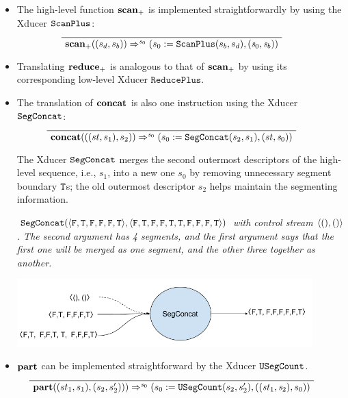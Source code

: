 \begin{itemize}
\item The high-level function $\mathbf{scan}_+$ is implemented straightforwardly by using the  Xducer $\mathtt{ScanPlus}_{}$:
	$$	\PT{
	\Axiom{\Transf{\*{scan}_+}{(s_d,s_b)}{\s_0}{}{\sfun{\sdef{s_0}{\scanf{s_b}{s_d}}} {(\s_0,\s_b)}}}
}$$

\item Translating $\mathbf{reduce}_+$ is analogous to that of $\mathbf{scan}_+$ by using its corresponding low-level Xducer $\mathtt{ReducePlus}$.

\item The translation of $\mathbf{concat}$ is also one instruction using the Xducer $\mathtt{SegConcat}$:
$$	\PT{
	\Axiom{\Transf{\*{concat}}{((st,s_1),s_2)}{\s_0}{}{\sfun{\sdef{s_0}{\segconcat(s_2,s_1)}} {(st,\s_0)}}}
}$$


The Xducer $\mathtt{SegConcat}$ merges the second outermost descriptors of the high-level sequence, i.e., $s_1$, into a new one $s_0$ by removing unnecessary segment boundary $\mathtt{T}$s; the old outermost descriptor $s_2$ helps maintain the segmenting information.

\begin{example} \emph{$\segconcat(\<\F,\T,\F,\F,\F,\T\'>,\< \F,\T, \F,\F,\T,\T, \F,\F, \F,\T \'>)$ with control stream $\<(),()\'>$. The second argument has 4 segments, and the first argument says that the first one will be merged as one segment, and the other three together as another.}\\
	\begin{center}
		\includegraphics[width=0.9\textwidth]{fig/segconcatxducer.png}
	\end{center}
\end{example}


\item $\mathbf{part}$ can be implemented straightforward by the Xducer $\mathtt{USegCount}$.
$$	\PT{
	\Axiom{\Transf{\*{part}}{(st_1,s_1),(s_2,s_2'))}{\s_0}{}{\sfun{\sdef{s_0}{\usegcount(s_2,s_2')}} {((\st_1,\s_2),s_0)}}}
}$$


\end{itemize}
